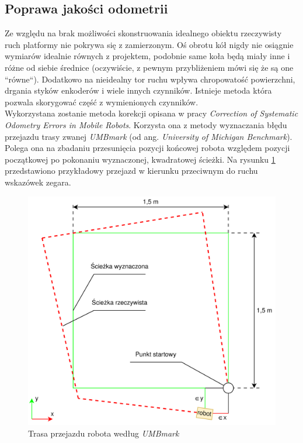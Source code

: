 \subsection{Poprawa jakości odometrii}
Ze względu na brak możliwości skonstruowania idealnego obiektu rzeczywisty ruch platformy nie pokrywa się z zamierzonym. Oś obrotu kół nigdy nie osiągnie wymiarów idealnie równych z projektem, podobnie same koła będą miały inne i różne od siebie średnice (oczywiście, z pewnym przybliżeniem mówi się że są one ``równe``). Dodatkowo na nieidealny tor ruchu wpływa chropowatość powierzchni, drgania styków enkoderów i wiele innych czynników. Istnieje metoda która pozwala skorygować część z wymienionych czynników.
\\

Wykorzystana zostanie metoda korekcji opisana w pracy \emph{Correction of Systematic Odometry Errors in Mobile Robots}\cite{Borenstein1995}. Korzysta ona z metody wyznaczania błędu przejazdu trasy zwanej \emph{UMBmark} (od ang. \emph{University of Michigan Benchmark}). Polega ona na zbadaniu przesunięcia pozycji końcowej robota względem pozycji początkowej po pokonaniu wyznaczonej, kwadratowej ścieżki. Na rysunku \ref{fig:umbenchmark-path} przedstawiono przykładowy przejazd w kierunku przeciwnym do ruchu wskazówek zegara.

\begin{figure}[ht]
	\centering
		\includegraphics[width=0.8\linewidth]{rys/umbenchmark-path.pdf}
	\caption{Trasa przejazdu robota według \emph{UMBmark}}
	\label{fig:umbenchmark-path}
\end{figure}

